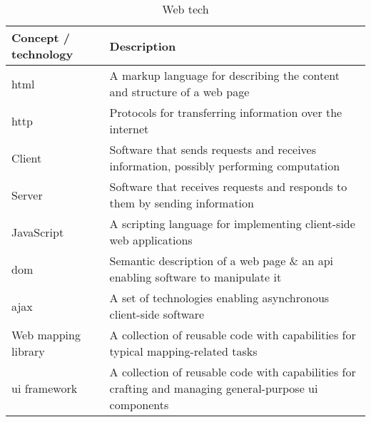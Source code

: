 \begin{table}[H]
	\caption{
		Web tech
	}
	\label{tab:web tech}
	\centering
	\begin{tabular}{ | L{0.15\textwidth} | L{0.75\textwidth} | }
		\hline
		\textbf{Concept / technology}
		& \textbf{Description} \\
		\hline
		\hline
		\acrshort{html}
		& A markup language for describing the content and structure of a web page \\
		\hline
		\acrshort{http}
		& Protocols for transferring information over the internet \\
		\hline
		Client
		& Software that sends requests and receives information, possibly performing computation \\
		\hline
		Server
		& Software that receives requests and responds to them by sending information \\
		\hline
		JavaScript
		& A scripting language for implementing client-side web applications \\
		\hline
		\acrshort{dom}
		& Semantic description of a web page \&
		an \acrshort{api} enabling software to manipulate it \\
		\hline
		\acrshort{ajax}
		& A set of technologies enabling asynchronous client-side software \\
		\hline
		Web mapping library
		& A collection of reusable code with capabilities for typical mapping-related tasks \\
		\hline
		\acrshort{ui} framework
		& A collection of reusable code with capabilities for
		crafting and managing general-purpose \acrshort{ui} components \\
		\hline
	\end{tabular}
\end{table}
